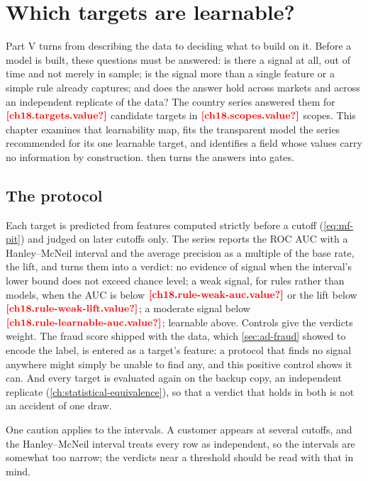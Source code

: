 \chapter{Which targets are learnable?}\label{ch:learnability}

Part V turns from describing the data to deciding what to build on it. Before a model is built, these questions must be answered: is there a signal at all, out of time and not merely in sample; is the signal more than a single feature or a
simple rule already captures; and does the answer hold across markets and across an independent replicate of the data?
The country series answered them for $\est{ch18.targets}{value}$ candidate targets in $\est{ch18.scopes}{value}$ scopes. This chapter examines that learnability map,
fits the transparent model the series recommended for its one learnable target, and identifies a field whose values carry
no information by construction.  then turns the answers into gates.

\section{The protocol}\label{sec:le-protocol}

Each target is predicted from features computed strictly before a cutoff (\cref{eq:mf-pit}) and judged on later cutoffs only.
The series reports the ROC AUC with a Hanley--McNeil interval \autocite{hanley1982} and the average precision as a multiple of
the base rate, the lift, and turns them into a verdict: no evidence of signal when the interval's lower bound does not exceed chance level; a weak signal, for rules rather than models, when the AUC is below $\est{ch18.rule-weak-auc}{value}$ or the lift
below $\est{ch18.rule-weak-lift}{value}$; a moderate signal below $\est{ch18.rule-learnable-auc}{value}$; learnable above. Controls give the verdicts weight. The fraud score shipped with the data, which \cref{sec:ad-fraud} showed to encode the
label, is entered as a target's feature: a protocol that finds no signal anywhere might simply be unable to find any, and this
positive control shows it can. And every target is evaluated again on the backup copy, an independent replicate
(\cref{ch:statistical-equivalence}), so that a verdict that holds in both is not an accident of one draw.

One caution applies to the intervals. A customer appears at several cutoffs, and the Hanley--McNeil interval treats every row
as independent, so the intervals are somewhat too narrow; the verdicts near a threshold should be read with that in mind.

